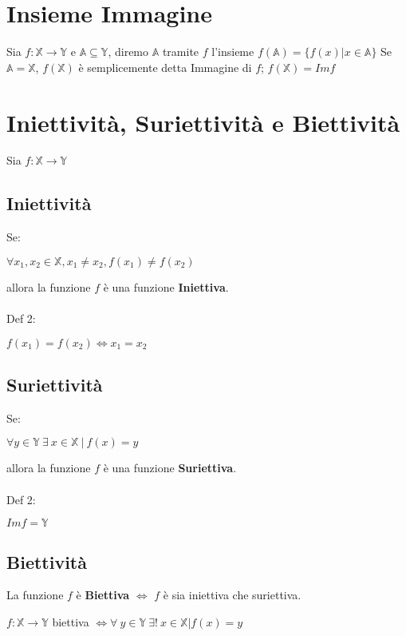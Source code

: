 \section{Insieme Immagine}
Sia $f: \mathbb{X} \rightarrow \mathbb{Y}$ e $\mathbb{A} \subseteq \mathbb{Y}$, diremo $\mathbb{A}$ tramite $f$ l'insieme $f(\mathbb{A}) = \{f(x) | x \in \mathbb{A}\}$
Se $\mathbb{A} = \mathbb{X}$, $f(\mathbb{X})$ è semplicemente detta Immagine di $f$; $f(\mathbb{X}) = Imf$

\section{Iniettività, Suriettività e Biettività}
Sia $f: \mathbb{X} \rightarrow \mathbb{Y}$
\subsection{Iniettività}
Se: \begin{Large}
$\forall x_1,x_2 \in \mathbb{X}, x_1 \neq x_2, f(x_1) \neq f(x_2)$ 
\end{Large} 
allora la funzione $f$ è una funzione \textbf{Iniettiva}.\\
\\
Def 2:\\
\begin{Large}
$f(x_1) = f(x_2) \iff x_1=x_2$ 
\end{Large}

\subsection{Suriettività}
Se: \begin{Large}
$\forall y \in \mathbb{Y}\ \exists\ x \in \mathbb{X}\ |\ f(x) = y$ 
\end{Large} 
allora la funzione $f$ è una funzione \textbf{Suriettiva}.\\
\\
Def 2:\\
\begin{Large}
$Imf = \mathbb{Y}$ 
\end{Large}

\subsection{Biettività}
La funzione $f$ è \textbf{Biettiva} $\iff$ $f$ è sia iniettiva che suriettiva.\\
\begin{Large}
$f: \mathbb{X} \rightarrow \mathbb{Y}$ biettiva $\iff \forall\ y \in \mathbb{Y}\ \exists !\ x \in \mathbb{X} | f(x)=y$
\end{Large}

